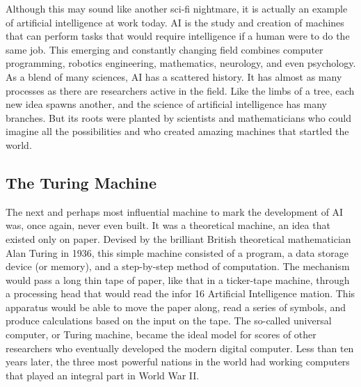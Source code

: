\documentclass[12pt]{article}
\begin{document}
 Although this may sound like another sci-fi nightmare, it is actually an example of artificial intelligence at work today. AI is the study and creation of machines that can perform tasks that would require intelligence if a human were to do the same job. This emerging and constantly changing field combines computer programming, robotics engineering, mathematics, neurology, and even psychology. As a blend of many sciences, AI has a scattered history. It has almost as
many processes as there are researchers active in the field. Like the limbs of a tree, each new idea spawns another, and the science of artificial intelligence has many branches. But its roots were planted by scientists and mathematicians who could imagine all the possibilities and who created amazing machines that startled the world.\\
\huge
\subsection{The Turing Machine}
\large
 The next and perhaps most influential machine to mark the development of AI was, once again, never even built. It was a theoretical machine, an idea that existed only on paper. Devised by the brilliant British theoretical mathematician Alan Turing in 1936, this simple machine consisted of a program, a data storage device (or memory), and a step-by-step method of computation. The mechanism would pass a long thin tape of paper, like that in a ticker-tape machine, through a processing head that would read the infor
16 Artificial Intelligence
mation. This apparatus would be able to move the paper along, read a series of symbols, and produce calculations based on the input on the tape. The so-called universal computer, or Turing machine, became the ideal model for scores of other researchers who eventually developed the modern digital computer. Less than ten years later, the three most powerful nations in the world had working computers that played an integral part in World War II.\\
\huge
\end{document}
